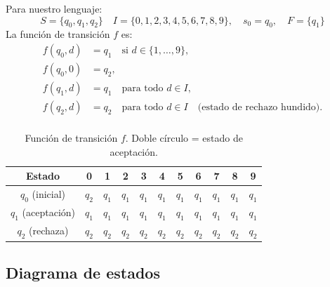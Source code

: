 \documentclass[10pt,a4paper]{article}
\theoremstyle{definition}
\begin{document}
Para nuestro lenguaje:
\[
    S = \{q_0, q_1, q_2\} \quad
    I = \{0,1,2,3,4,5,6,7,8,9\}, \quad
    s_0 = q_0, \quad
    F = \{q_1\}
\]
La función de transición $f$ es:
\begin{align*}
    f(q_0, d) &= q_1 \quad \text{si } d \in \{1,\dots,9\}, \\
    f(q_0, 0) &= q_2, \\
    f(q_1, d) &= q_1 \quad \text{para todo } d \in I, \\
    f(q_2, d) &= q_2 \quad \text{para todo } d \in I \quad \text{(estado de rechazo hundido)}. \\
\end{align*}

\begin{table}[h]
\centering
    \begin{tabular}{c|cccccccccc}
        \toprule
        Estado & 0 & 1 & 2 & 3 & 4 & 5 & 6 & 7 & 8 & 9 \\
        \midrule
        $q_0$ (inicial) & $q_2$ & $q_1$ & $q_1$ & $q_1$ & $q_1$ & $q_1$ & $q_1$ & $q_1$ & $q_1$ & $q_1$ \\
        $q_1$ (aceptación) & $q_1$ & $q_1$ & $q_1$ & $q_1$ & $q_1$ & $q_1$ & $q_1$ & $q_1$ & $q_1$ & $q_1$ \\
        $q_2$ (rechaza) & $q_2$ & $q_2$ & $q_2$ & $q_2$ & $q_2$ & $q_2$ & $q_2$ & $q_2$ & $q_2$ & $q_2$ \\
        \bottomrule
    \end{tabular}
    \caption{Función de transición $f$. Doble círculo = estado de aceptación.}

\end{table}

\subsection{Diagrama de estados}

\begin{center}
    \shorthandoff{<>}
    \shorthandon{<>}
\end{center}
\end{document}
